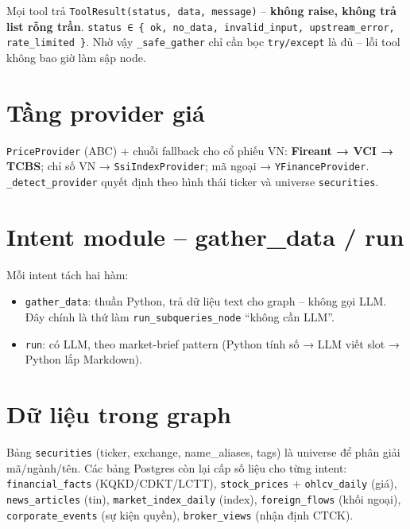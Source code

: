 \documentclass[12pt, a4paper]{report}
\begin{document}
Mọi tool trả \texttt{ToolResult(status, data, message)} -- \textbf{không raise, không trả list rỗng trần}. \texttt{status ∈ \{ ok, no\_data, invalid\_input, upstream\_error, rate\_limited \}}. Nhờ vậy \texttt{\_safe\_gather} chỉ cần bọc \texttt{try/except} là đủ -- lỗi tool không bao giờ làm sập node.

\section{Tầng provider giá}

\texttt{PriceProvider} (ABC) + chuỗi fallback cho cổ phiếu VN: \textbf{Fireant → VCI → TCBS}; chỉ số VN → \texttt{SsiIndexProvider}; mã ngoại → \texttt{YFinanceProvider}. \texttt{\_detect\_provider} quyết định theo hình thái ticker và universe \texttt{securities}.

\section{Intent module -- gather\_data / run}

Mỗi intent tách hai hàm:

\begin{itemize}
  \item \texttt{gather\_data}: thuần Python, trả dữ liệu text cho graph -- không gọi LLM. Đây chính là thứ làm \texttt{run\_subqueries\_node} ``không cần LLM''.
  \item \texttt{run}: có LLM, theo market-brief pattern (Python tính số → LLM viết slot → Python lắp Markdown).
\end{itemize}

\section{Dữ liệu trong graph}

Bảng \texttt{securities} (ticker, exchange, name\_aliases, tags) là universe để phân giải mã/ngành/tên. Các bảng Postgres còn lại cấp số liệu cho từng intent: \texttt{financial\_facts} (KQKD/CDKT/LCTT), \texttt{stock\_prices} + \texttt{ohlcv\_daily} (giá), \texttt{news\_articles} (tin), \texttt{market\_index\_daily} (index), \texttt{foreign\_flows} (khối ngoại), \texttt{corporate\_events} (sự kiện quyền), \texttt{broker\_views} (nhận định CTCK).

\newpage

\end{document}
